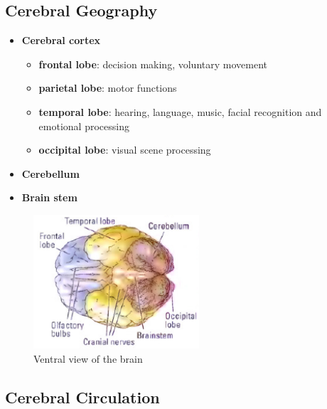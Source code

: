 \documentclass[12pt]{article}
\begin{document}
\subsection{Cerebral Geography}

\begin{itemize}
\item {\textbf{Cerebral cortex}
    \begin{itemize}
    \item {\textbf{frontal lobe}: decision making, voluntary movement}
    \item {\textbf{parietal lobe}: motor functions}
    \item {\textbf{temporal lobe}: hearing, language, music, facial recognition and emotional processing}
    \item {\textbf{occipital lobe}: visual scene processing}
    \end{itemize}
}
\item {\textbf{Cerebellum}}
\item {\textbf{Brain stem}}
\end{itemize}
\begin{figure}[h]
    \centering
    \includegraphics[width=0.55\textwidth]{ventral_view_brain.png}
    \caption{Ventral view of the brain}
\end{figure}

\subsection{Cerebral Circulation}
\end{document}
